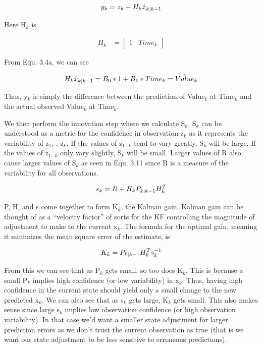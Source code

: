   \begin{equation}
  \centering
  y_{k} = z_{k} - H_{k}\hat{x}_{k|k-1}
  \end{equation}
  
  Here H$_{k}$ is
  
  \begin{align}
    H_{k} &= \begin{bmatrix}
           1&Time_{k}
         \end{bmatrix}
  \end{align}
  
  From Equ. 3.4a, we can see 
  
  \begin{equation}
  \centering
H_{k}\hat{x}_{k|k-1} = B_{0}*1 + B_{1}*Time_{k} = \hat{Value}_{k}
  \end{equation}
  
  Thus, y$_{k}$ is simply the difference between the prediction of Value$_{k}$ at Time$_{k}$ and the actual observed Value$_{k}$ at Time$_{k}$.
  
  We then perform the innovation step where we calculate S$_{k}$. S$_{k}$ can be understood as a metric for the confidence in observation z$_{k}$ as it represents the variability of z$_{1}$, \cdots , z$_{k}$. If the values of z$_{1 \cdots k}$ tend to vary greatly, S$_{k}$ will be large. If the values of z$_{1 \cdots k}$ only vary slightly, S$_{k}$ will be small. Larger values of R also cause larger values of S$_{k}$ as seen in Equ. 3.11 since R is a measure of the variability for all observations.
  
  \begin{equation}
  \centering
s_{k} = R + H_{k}P_{k|k-1}H_{k}^{T}
  \end{equation}
  
  P, H, and s come together to form K$_{k}$, the Kalman gain. Kalman gain can be thought of as a ``velocity factor'' of sorts for the KF controlling the magnitude of adjustment to make to the current x$_{k}$. The formula for the optimal gain, meaning it minimizes the mean square error of the estimate, is  
  
    \begin{equation}
  \centering
K_{k} = P_{k|k-1}H_{k}^{T}s_{k}^{-1}
  \end{equation}
  
  From this we can see that as P$_{k}$ gets small, so too does K$_{k}$. This is because a small P$_{k}$ implies high confidence (or low variability) in x$_{k}$. Thus, having high confidence in the current state should yield only a small change to the new predicted x$_{k}$. We can also see that as s$_{k}$ gets large, K$_{k}$ gets small. This also makes sense since large s$_{k}$ implies low observation confidence (or high observation variability). In that case we'd want a smaller state adjustment for larger prediction errors as we don't trust the  current observation as true (that is we want our state adjustment to be less sensitive to erroneous predictions).
  
